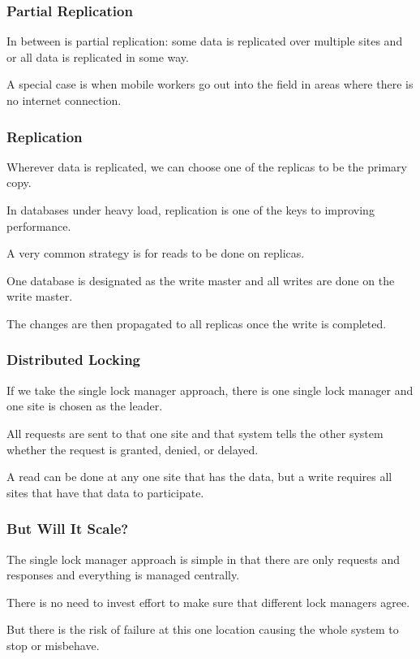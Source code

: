 \begin{frame}
\frametitle{Partial Replication}

In between is partial replication: some data is replicated over multiple sites and or all data is replicated in some way. 

A special case is when mobile workers go out into the field in areas where there is no internet connection.

\end{frame}


\begin{frame}
\frametitle{Replication}
Wherever data is replicated, we can choose one of the replicas to be the primary copy.

In databases under heavy load, replication is one of the keys to improving performance. 

A very common strategy is for reads to be done on replicas. 

One database is designated as the write master and all writes are done on the write master. 

The changes are then propagated to all replicas once the write is completed.


\end{frame}


\begin{frame}
\frametitle{Distributed Locking}

If we take the single lock manager approach, there is one single lock manager and one site is chosen as the leader. 

All requests are sent to that one site and that system tells the other system whether the request is granted, denied, or delayed. 

A read can be done at any one site that has the data, but a write requires all sites that have that data to participate.


\end{frame}


\begin{frame}
\frametitle{But Will It Scale?}

The single lock manager approach is simple in that there are only requests and responses and everything is managed centrally.

There is no need to invest effort to make sure that different lock managers agree. 

But there is the risk of failure at this one location causing the whole system to stop or misbehave.


\end{frame}

